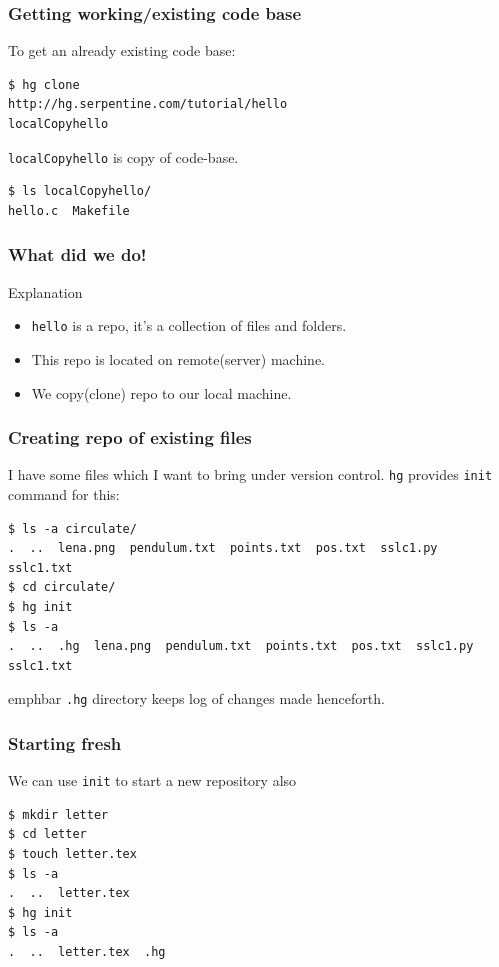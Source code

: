 \documentclass[14pt,compress]{beamer}
\newcommand{\emphbar}[1]
{\begin{beamercolorbox}[rounded=true]{emphbar} 
      {#1}
 \end{beamercolorbox}
}
\newcommand{\typ}[1]{\lstinline{#1}}
\begin{document}
\begin{frame}[fragile]
  \frametitle{Getting working/existing code base}
  To get an already existing code base:
  \begin{lstlisting}
$ hg clone 
http://hg.serpentine.com/tutorial/hello 
localCopyhello
  \end{lstlisting}
\typ{localCopyhello} is copy of code-base. 
  \begin{lstlisting}
$ ls localCopyhello/
hello.c  Makefile
  \end{lstlisting}
\end{frame}

\begin{frame}[fragile]
  \frametitle{What did we do!}
  \begin{block}{Explanation}
    \begin{itemize}
    \item<1-> \typ{hello} is a \alert{repo}, it's a collection of files and folders. 
    \item<2-> This repo is located on remote(\alert{server}) machine.    
    \item<3-> We copy(\alert{clone}) repo to our local machine.
    \end{itemize}    
  \end{block}
\end{frame}

\begin{frame}[fragile]
  \frametitle{Creating repo of existing files}
  I have some files which I want to bring under version control. \typ{hg} provides \alert{\typ{init}} command for this: 
  \begin{lstlisting}
$ ls -a circulate/
.  ..  lena.png  pendulum.txt  points.txt  pos.txt  sslc1.py  sslc1.txt
$ cd circulate/
$ hg init
$ ls -a
.  ..  .hg  lena.png  pendulum.txt  points.txt  pos.txt  sslc1.py  sslc1.txt    
  \end{lstlisting}
  \emphbar{\typ{.hg} directory keeps log of changes made henceforth.}
\end{frame}

\begin{frame}[fragile]
  \frametitle{Starting fresh}
  We can use \typ{init} to start a new repository also
  \begin{lstlisting}
$ mkdir letter
$ cd letter
$ touch letter.tex
$ ls -a
.  ..  letter.tex
$ hg init
$ ls -a
.  ..  letter.tex  .hg
  \end{lstlisting}
\end{frame}
\end{document}
